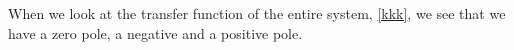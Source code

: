 %
%
When we look at the transfer function of the entire system, \autoref{kkk}, we see that we have a zero pole, a negative and a positive pole. \newpar

